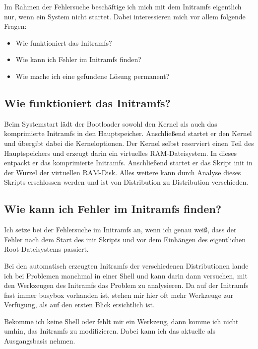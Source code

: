 Im Rahmen der Fehlersuche beschäftige ich mich mit dem Initramfs eigentlich
nur, wenn ein System nicht startet. Dabei interessieren mich vor allem
folgende Fragen:
\begin{itemize}
    \item Wie funktioniert das Initramfs?
    \item Wie kann ich Fehler im Initramfs finden?
    \item Wie mache ich eine gefundene Lösung permanent?
\end{itemize}

\subsection{Wie funktioniert das Initramfs?}

Beim Systemstart lädt der Bootloader sowohl den Kernel als auch das
komprimierte Initramfs in den Hauptspeicher.
Anschließend startet er den Kernel und übergibt dabei die Kerneloptionen.
Der Kernel selbst reserviert einen Teil des Hauptspeichers und erzeugt darin
ein virtuelles RAM-Dateisystem.
In dieses entpackt er das komprimierte Initramfs.
Anschließend startet er das Skript init in der Wurzel der virtuellen RAM-Disk.
Alles weitere kann durch Analyse dieses Skripts erschlossen werden und ist von
Distribution zu Distribution verschieden.

\subsection{Wie kann ich Fehler im Initramfs finden?}

Ich setze bei der Fehlersuche im Initramfs an, wenn ich genau weiß, dass der
Fehler nach dem Start des init Skripts und vor dem Einhängen des eigentlichen
Root-Dateisystems passiert.

Bei den automatisch erzeugten Initramfs der verschiedenen Distributionen lande
ich bei Problemen manchmal in einer Shell und kann darin dann versuchen, mit
den Werkzeugen des Initramfs das Problem zu analysieren.
Da auf der Initramfs fast immer busybox vorhanden ist, stehen mir hier oft
mehr Werkzeuge zur Verfügung, als auf den ersten Blick ersichtlich ist.

Bekomme ich keine Shell oder fehlt mir ein Werkzeug, dann komme ich nicht
umhin, das Initramfs zu modifizieren.
Dabei kann ich das aktuelle als Ausgangsbasis nehmen.

